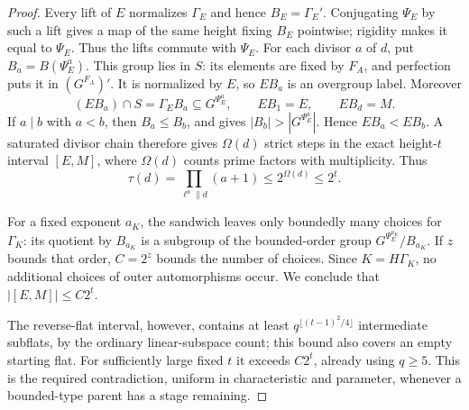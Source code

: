 \begin{proof}
Every lift of $E$ normalizes $\Gamma_E$ and hence $B_E=\Gamma_E'$.
Conjugating $\Psi_E$ by such a lift gives a map of the same height
fixing $B_E$ pointwise; rigidity makes it equal to $\Psi_E$. Thus the
lifts commute with $\Psi_E$. For each divisor $a$ of $d$, put
$B_a=B(\Psi_E^a)$. This group lies in $S$: its elements are fixed by
$F_A$, and perfection puts it in $(G^{F_A})'$. It is normalized by
$E$, so $E B_a$ is an overgroup label. Moreover
\[
 (E B_a)\cap S=\Gamma_E B_a\subseteq G^{\Psi_E^a},
 \qquad E B_1=E,\qquad E B_d=M.
\]
If $a\mid b$ with $a<b$, then $B_a\le B_b$, and
 gives $|B_b|>|G^{\Psi_E^a}|$.
Hence $E B_a<E B_b$. A saturated divisor chain therefore gives
$\Omega(d)$ strict steps in the exact height-$t$ interval $[E,M]$,
where $\Omega(d)$ counts prime factors with multiplicity. Thus
\[
 \tau(d)=\prod_{\ell^a\parallel d}(a+1)
 \le2^{\Omega(d)}\le2^t.
\]

For a fixed exponent $a_K$, the sandwich leaves only boundedly many
choices for $\Gamma_K$: its quotient by $B_{a_K}$ is a subgroup of
the bounded-order group $G^{\Psi_E^{a_K}}/B_{a_K}$. If $z$ bounds
that order, $C=2^z$ bounds the number of choices. Since
$K=H\Gamma_K$, no additional choices of outer automorphisms occur.
We conclude that $|[E,M]|\le C2^t$.

The reverse-flat interval, however, contains at least
$q^{\lfloor(t-1)^2/4\rfloor}$ intermediate subflats, by the ordinary
linear-subspace count; this bound also covers an empty starting flat.
For sufficiently large fixed $t$ it exceeds $C2^t$, already using
$q\ge5$. This is the required contradiction, uniform in characteristic
and parameter, whenever a bounded-type parent has a stage remaining.
\end{proof}
